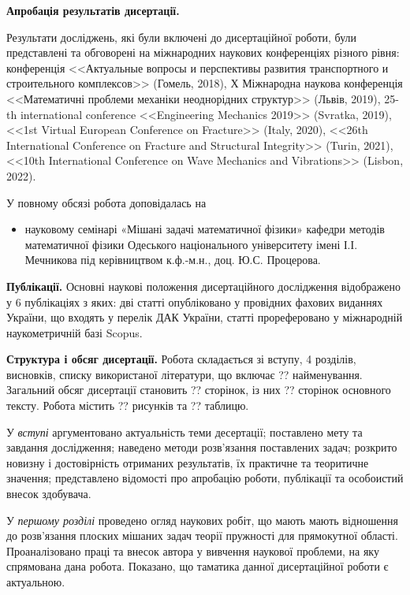 \textbf{Апробація результатів дисертації.}

Результати досліджень, які були включені до дисертаційної роботи, були представлені та обговорені на міжнародних наукових конференціях різного рівня:
конференція  <<Актуальные вопросы и перспективы развития транспортного и строительного комплексов>> (Гомель, 2018),
Х Міжнародна наукова конференція <<Математичні проблеми механіки неоднорідних структур>> (Львів, 2019),
25-th international conference <<Engineering Mechanics 2019>> (Svratka, 2019),
<<1st Virtual European Conference on Fracture>> (Italy, 2020),
<<26th International Conference on Fracture and Structural Integrity>> (Turin, 2021),
<<10th International Conference on Wave Mechanics and Vibrations>> (Lisbon, 2022).

У повному обсязі робота доповідалась на
\begin{itemize}
    \item науковому семінарі «Мішані задачі математичної фізики» кафедри методів
    математичної фізики Одеського національного університету імені І.І. Мечникова під керівництвом к.ф.-м.н., доц. Ю.С. Процерова.
\end{itemize}

\textbf{Публікації.}
Основні наукові положення дисертаційного дослідження відображено у 6 публікаціях з яких:
дві статті \cite{pozhylenkov_2,pozhylenkov_3} опубліковано у провідних фахових виданнях України, що входять у перелік ДАК України,
статті \cite{pozhylenkov_1,pozhylenkov_4,pozhylenkov_5,pozhylenkov_6} прореферовано у міжнародній наукометричній базі Scopus.

\textbf{Структура і обсяг дисертації.}
Робота складається зі вступу, 4 розділів, висновків, списку використаної літератури, що включає ?? найменування. Загальний обсяг дисертації становить ?? сторінок, із них ?? сторінок основного тексту. Робота містить ?? рисунків та ?? таблицю.

У \textit{вступі} аргументовано актуальність теми десертації; 
поставлено мету та завдання дослідження;
наведено методи розв'язання поставлених задач;
розкрито новизну і достовірність отриманих результатів, їх практичне та теоритичне значення;
представлено відомості про апробацію роботи, публікації та особоистий внесок здобувача.

У \textit{першому розділі} проведено огляд наукових робіт, що мають мають відношення до розв'язання плоских мішаних задач теорії пружності для прямокутної області.
Проаналізовано праці та внесок автора у вивчення наукової проблеми, на яку спрямована дана робота.
Показано, що таматика данної дисертаційної роботи є актуальною.

